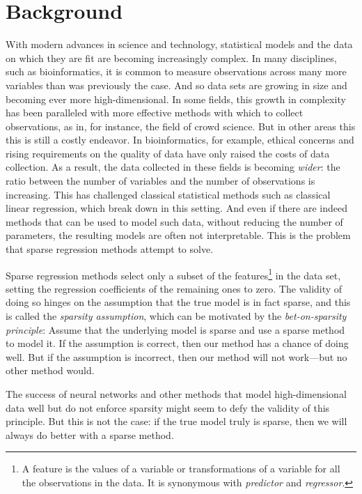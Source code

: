 \documentclass{book}
\begin{document}
\section{Background}


With modern advances in science and technology, statistical models and the data on which they are fit are becoming increasingly complex. In many disciplines, such as bioinformatics, it is common to measure observations across many more variables than was previously the case. And so data sets are growing in size and becoming ever more high-dimensional. In some fields, this growth in complexity has been paralleled with more effective methods with which to collect observations, as in, for instance, the field of crowd science. But in other areas this this is still a costly endeavor. In bioinformatics, for example, ethical concerns and rising requirements on the quality of data have only raised the costs of data collection. As a result, the data collected in these fields is becoming \emph{wider}: the ratio between the number of variables and the number of observations is increasing. This has challenged classical statistical methods such as classical linear regression, which break down in this setting. And even if there are indeed methods that can be used to model such data, without reducing the number of parameters, the resulting models are often not interpretable. This is the problem that sparse regression methods attempt to solve.

Sparse regression methods select only a subset of the features\footnote{A feature is the values of a variable or transformations of a variable for all the observations in the data. It is synonymous with \emph{predictor} and \emph{regressor}.} in the data set, setting the regression coefficients of the remaining ones to zero. The validity of doing so hinges on the assumption that the true model is in fact sparse, and this is called the \emph{sparsity assumption}, which can be motivated by the \emph{bet-on-sparsity principle}: Assume that the underlying model is sparse and use a sparse method to model it. If the assumption is correct, then our method has a chance of doing well. But if the assumption is incorrect, then our method will not work---but no other method would.

The success of neural networks and other methods that model high-dimensional data well but do not enforce sparsity might seem to defy the validity of this principle. But this is not the case: if the true model truly is sparse, then we will always do better with a sparse method.
\end{document}
